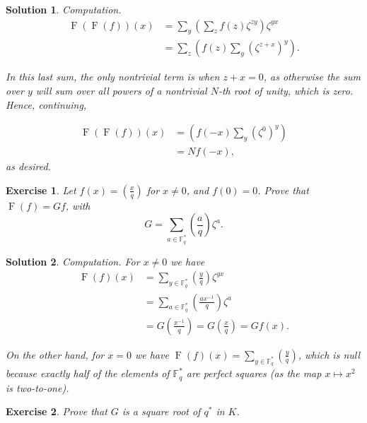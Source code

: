 \documentclass{article}
\newtheorem{ex}{Exercise}
\theoremstyle{nonumberplain}
\newtheorem{sol}{Solution}
\newcommand{\FF}{\mathbb{F}}
\DeclareMathOperator{\Fr}{F}
\newcommand{\legendre}[2]{\genfrac{(}{)}{}{}{#1}{#2}}
\begin{document}
\begin{sol}
Computation.
\begin{equation}
\begin{aligned}
\Fr(\Fr(f))(x)
&= \sum_y \left( \sum_z f(z) \zeta^{zy} \right) \zeta^{yx}\\
&= \sum_z \left( f(z) \sum_y (\zeta^{z+x})^y \right).
\end{aligned}
\end{equation}

In this last sum, the only nontrivial term is when $z+x = 0$, as otherwise the sum over $y$ will sum over all powers of a nontrivial $N$-th root of unity, which is zero. Hence, continuing,

\begin{equation}
\begin{aligned}
\Fr(\Fr(f))(x)
&= \left( f(-x) \sum_y (\zeta^{0})^y \right)\\
&= N f(-x),
\end{aligned}
\end{equation}
as desired.
\end{sol}

\begin{ex}
Let $f(x) = \legendre xq$ for $x \neq 0$, and $f(0) = 0$. Prove that $\Fr(f) = G f$, with
\begin{equation}
G = \sum_{a \in \FF_q^*} \legendre aq \zeta^a.
\end{equation}
\end{ex}

\begin{sol}
Computation. For $x \neq 0$ we have
\begin{equation}
\begin{aligned}
\Fr(f)(x) &= \sum_{y \in \FF_q^*} \legendre yq \zeta^{yx}\\
&= \sum_{a \in \FF_q^*} \legendre{a x^{-1}}q \zeta^a\\
&= G \legendre{x^{-1}}q = G \legendre xq = G f(x).
\end{aligned}
\end{equation}

On the other hand, for $x = 0$ we have $\Fr(f)(x) = \sum_{y \in \FF_q^*} \legendre yq$, which is null because exactly half of the elements of $\FF_q^*$ are perfect squares (as the map $x \mapsto x^2$ is two-to-one).
\end{sol}

\begin{ex}
Prove that $G$ is a square root of $q^*$ in $K$.
\end{ex}
\end{document}

